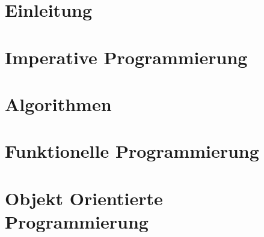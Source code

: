 \documentclass{article}
\begin{document}
\tableofcontents %
\newpage

\section{Einleitung}
%


\section{Imperative Programmierung}


\section{Algorithmen}



\section{Funktionelle Programmierung}



\section{Objekt Orientierte Programmierung}


\printbibliography

\end{document}
